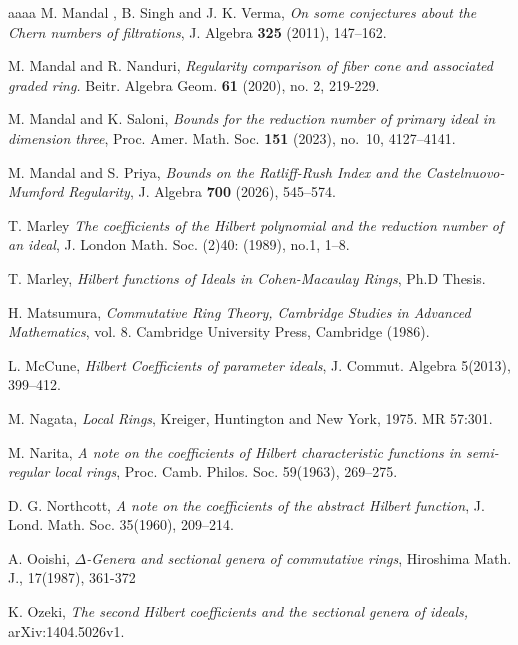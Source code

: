 \documentclass[reqno,a4paper,dvipsnames]{amsart}
\theoremstyle{definition}
\begin{document}
\begin{thebibliography}{aaaa}
M. Mandal , B. Singh and J. K. Verma, 
\textit{On some conjectures about the Chern numbers of filtrations}, J. Algebra {\bf 325} (2011), 147–162.

M. Mandal and R. Nanduri,
\textit{Regularity comparison of fiber cone and associated graded ring.}
Beitr. Algebra Geom. {\bf 61} (2020), no. 2, 219-229.

 M. Mandal and K. Saloni, \textit{Bounds for the reduction number of primary ideal in dimension three}, Proc. Amer. Math. Soc. {\bf 151} (2023), no.~10, 4127--4141.

M. Mandal and S. Priya,
\textit{Bounds on the  Ratliff-Rush Index and the Castelnuovo-Mumford Regularity}, J. Algebra {\bf 700} (2026), 545–574.

 T. Marley
\textit{The coefficients of the Hilbert polynomial and the reduction number of an ideal},
J. London Math. Soc. (2)40: (1989), no.1, 1–8. 


 T. Marley, \textit{Hilbert functions of Ideals in Cohen-Macaulay Rings}, Ph.D Thesis.

 H. Matsumura, \textit{Commutative Ring Theory, Cambridge Studies in Advanced Mathematics}, vol. 8. Cambridge University Press, Cambridge (1986). 


  L. McCune, \textit{Hilbert Coefficients of parameter ideals}, J. Commut. Algebra 5(2013), 399–412.

  M. Nagata, \textit{Local Rings}, Kreiger, Huntington and New York, 1975. MR 57:301.

 M. Narita, \textit{A note on the coefficients of Hilbert characteristic functions in semi-regular local rings}, Proc. Camb. Philos. Soc. 59(1963), 269–275.

 D. G. Northcott, \textit{A note on the coefficients of the abstract Hilbert function}, J. Lond. Math. Soc. 35(1960), 209–214.


 A. Ooishi, \textit{$\Delta$-Genera and sectional genera of commutative rings}, Hiroshima Math. J.,  17(1987), 361-372 
 
K. Ozeki, \textit{The second Hilbert coefficients and the sectional genera of ideals,}  arXiv:1404.5026v1. 



\end{thebibliography}
\end{document}
